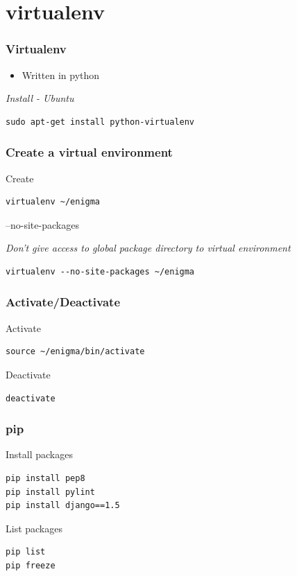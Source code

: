 \documentclass[bigger, presentation]{beamer}
\begin{document}
\section{virtualenv}
\label{sec-4}
\begin{frame}[fragile]
\frametitle{Virtualenv}
\label{sec-4-1}


\begin{itemize}
\item Written in python
\end{itemize}

   \emph{Install - Ubuntu}


\begin{verbatim}
sudo apt-get install python-virtualenv
\end{verbatim}
\end{frame}
\begin{frame}[fragile]
\frametitle{Create a virtual environment}
\label{sec-4-2}
\begin{block}{Create}
\label{sec-4-2-1}


\begin{verbatim}
virtualenv ~/enigma
\end{verbatim}
\end{block}
\begin{block}{--no-site-packages}
\label{sec-4-2-2}

    \emph{Don't give access to global package directory to virtual     environment}

\begin{verbatim}
virtualenv --no-site-packages ~/enigma
\end{verbatim}
\end{block}
\end{frame}
\begin{frame}[fragile]
\frametitle{Activate/Deactivate}
\label{sec-4-3}
\begin{block}{Activate}
\label{sec-4-3-1}


\begin{verbatim}
source ~/enigma/bin/activate
\end{verbatim}
\end{block}
\begin{block}{Deactivate}
\label{sec-4-3-2}


\begin{verbatim}
deactivate
\end{verbatim}
\end{block}
\end{frame}
\begin{frame}[fragile]
\frametitle{pip}
\label{sec-4-4}
\begin{block}{Install packages}
\label{sec-4-4-1}


\begin{verbatim}
pip install pep8
pip install pylint
pip install django==1.5
\end{verbatim}
\end{block}
\begin{block}{List packages}
\label{sec-4-4-2}


\begin{verbatim}
pip list
pip freeze
\end{verbatim}
\end{block}
\end{frame}
\end{document}
